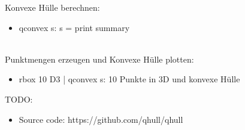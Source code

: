 \documentclass[12pt]{scrartcl}
\begin{document}
\ \\~\\~\\~\\~\\~\\~\\~\\~\\~\\

Konvexe Hülle berechnen:

\begin{itemize}
    \item qconvex s: s = print summary
\end{itemize}
\ \\


Punktmengen erzeugen und Konvexe Hülle plotten:
\begin{itemize}
    \item rbox 10 D3 | qconvex s: 10 Punkte in 3D und konvexe Hülle
\end{itemize}


TODO:
\begin{itemize}
    \item Source code: https://github.com/qhull/qhull
\end{itemize}





\end{document}
